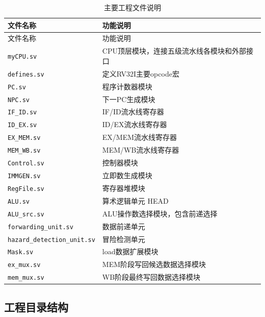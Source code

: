 \documentclass[12pt,a4paper]{ctexart}
\newcommand{\code}[1]{\texttt{#1}}
\begin{document}
\begin{longtable}{p{5cm}p{9cm}}
	\caption{主要工程文件说明}                                          \\
	\toprule
	文件名称                              & 功能说明                    \\
	\midrule
	\endfirsthead
	\toprule
	文件名称                              & 功能说明                    \\
	\midrule
	\endhead
	\code{myCPU.sv}                   & CPU顶层模块，连接五级流水线各模块和外部接口 \\
	\code{defines.sv}                 & 定义RV32I主要opcode宏        \\
	\code{PC.sv}                      & 程序计数器模块                 \\
	\code{NPC.sv}                     & 下一PC生成模块                \\
	\code{IF\_ID.sv}                  & IF/ID流水线寄存器             \\
	\code{ID\_EX.sv}                  & ID/EX流水线寄存器             \\
	\code{EX\_MEM.sv}                 & EX/MEM流水线寄存器            \\
	\code{MEM\_WB.sv}                 & MEM/WB流水线寄存器            \\
	\code{Control.sv}                 & 控制器模块                   \\
	\code{IMMGEN.sv}                  & 立即数生成模块                 \\
	\code{RegFile.sv}                 & 寄存器堆模块                  \\
	\code{ALU.sv}                     & 算术逻辑单元           HEAD   \\
	\code{ALU\_src.sv}                & ALU操作数选择模块，包含前递选择       \\
	\code{forwarding\_unit.sv}        & 数据前递单元                  \\
	\code{hazard\_detection\_unit.sv} & 冒险检测单元                  \\
	\code{Mask.sv}                    & load数据扩展模块              \\
	\code{ex\_mux.sv}                 & MEM阶段写回候选数据选择模块         \\
	\code{mem\_mux.sv}                & WB阶段最终写回数据选择模块          \\
	\bottomrule
\end{longtable}

\subsection{工程目录结构}
\end{document}

